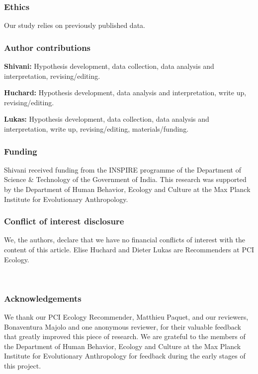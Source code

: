 \documentclass[
]{article}
\begin{document}
\hypertarget{ethics}{%
\subsubsection{Ethics}\label{ethics}}

Our study relies on previously published data.

\hypertarget{author-contributions}{%
\subsubsection{Author contributions}\label{author-contributions}}

\textbf{Shivani:} Hypothesis development, data collection, data analysis
and interpretation, revising/editing.

\textbf{Huchard:} Hypothesis development, data analysis and
interpretation, write up, revising/editing.

\textbf{Lukas:} Hypothesis development, data collection, data analysis
and interpretation, write up, revising/editing, materials/funding.

\hypertarget{funding}{%
\subsubsection{Funding}\label{funding}}

Shivani received funding from the INSPIRE programme of the Department of
Science \& Technology of the Government of India. This research was
supported by the Department of Human Behavior, Ecology and Culture at
the Max Planck Institute for Evolutionary Anthropology.

\hypertarget{conflict-of-interest-disclosure}{%
\subsubsection{Conflict of interest
disclosure}\label{conflict-of-interest-disclosure}}

We, the authors, declare that we have no financial conflicts of interest
with the content of this article. Elise Huchard and Dieter Lukas are
Recommenders at PCI Ecology.

~

\hypertarget{acknowledgements}{%
\subsubsection{Acknowledgements}\label{acknowledgements}}

We thank our PCI Ecology Recommender, Matthieu Paquet, and our
reviewers, Bonaventura Majolo and one anonymous reviewer, for their
valuable feedback that greatly improved this piece of research. We are
grateful to the members of the Department of Human Behavior, Ecology and
Culture at the Max Planck Institute for Evolutionary Anthropology for
feedback during the early stages of this project.
\end{document}
